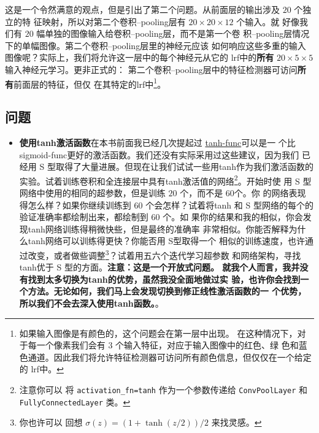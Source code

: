 这是一个令然满意的观点，但是引出了第二个问题。从前面层的输出涉及 $20$ 个独立的特
征映射，所以对第二个卷积--\gls*{pooling}层有 $20 \times 20 \times 12$ 个输入。就
好像我们有 $20$ 幅单独的图像输入给卷积--\gls*{pooling}层，而不是第一个卷
积--\gls*{pooling}层情况下的单幅图像。第二个卷积--\gls*{pooling}层里的神经元应该
如何响应这些多重的输入图像呢？实际上，我们将允许这一层中的每个神经元从它的%
\gls*{lrf}中的\textbf{所有} $20 \times 5 \times 5$ 输入神经元学习。更非正式的：
第二个卷积--\gls*{pooling}层中的特征检测器可访问\textbf{所有}前面层的特征，但仅
在其特定的\gls*{lrf}中\footnote{如果输入图像是有颜色的，这个问题会在第一层中出现。
  在这种情况下，对于每一个像素我们会有 3 个输入特征，对应于输入图像中的红色、绿
  色和蓝色通道。因此我们将允许特征检测器可访问所有颜色信息，但仅仅在一个给定的%
  \gls*{lrf}中。}。

\subsection*{问题}

\begin{itemize}
\item \textbf{使用\gls*{tanh}激活函数}\quad 在本书前面我已经几次提起过%
  \hyperref[subsec:other_models_of_artificial_neuron]{\gls*{tanh-func}}可以是一
  个比 \gls*{sigmoid-func}更好的激活函数。我们还没有实际采用过这些建议，因为我们
  已经用 S 型取得了大量进展。但现在让我们试试一些用\gls*{tanh}作为我们激活函数的
  实验。试着训练卷积和全连接层中具有\gls*{tanh}激活值的网络\footnote{注意你可以
    将 \lstinline!activation_fn=tanh! 作为一个参数传递给
    \lstinline!ConvPoolLayer! 和 \lstinline!FullyConnectedLayer! 类。}。开始时使
  用 S 型网络中使用的相同的超参数，但是训练 $20$ 个\epochs{}，而不是 $60$个。你
  的网络表现得怎么样？如果你继续训练到 $60$ 个\epochs{}会怎样？试着将\gls*{tanh}
  和 S 型网络的每个\epoch{}的验证准确率都绘制出来，都绘制到 $60$ 个\epochs{}。如
  果你的结果和我的相似，你会发现\gls*{tanh}网络训练得稍微快些，但是最终的准确率
  非常相似。你能否解释为什么\gls*{tanh}网络可以训练得更快？你能否用 S型取得一个
  相似的训练速度，也许通过改变\learningrate{}，或者做些调整\footnote{你也许可以
    回想 $\sigma(z) = (1+\tanh(z/2))/2$ 来找灵感。}？试着用五六个迭代学习超参数
  和网络架构，寻找\gls*{tanh}优于 S 型的方面。\textbf{注意：这是一个开放式问题。
    就我个人而言，我并没有找到太多切换为\gls*{tanh}的优势，虽然我没全面地做过实
    验，也许你会找到一个方法。无论如何，我们马上会发现切换到修正线性激活函数的一
    个优势，所以我们不会去深入使用\gls*{tanh}函数。}。
\end{itemize}

